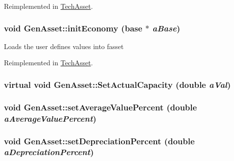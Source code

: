 Reimplemented in \hyperlink{class_tech_asset_ac7681ccf18e41a30b518f27cbde6a160}{TechAsset}.\hypertarget{class_gen_asset_a061638306e81bee77e8dfef34fe84a93}{
\subsubsection[{initEconomy}]{\setlength{\rightskip}{0pt plus 5cm}void GenAsset::initEconomy ({\bf base} $\ast$ {\em aBase})}}
\label{class_gen_asset_a061638306e81bee77e8dfef34fe84a93}
Loads the user defines values into fasset 

Reimplemented in \hyperlink{class_tech_asset_a405c511686ff6c8051ee748db53cd045}{TechAsset}.\hypertarget{class_gen_asset_a035e6cf6dbf11b247c330be31283bea8}{
\subsubsection[{SetActualCapacity}]{\setlength{\rightskip}{0pt plus 5cm}virtual void GenAsset::SetActualCapacity (double {\em aVal})}}
\label{class_gen_asset_a035e6cf6dbf11b247c330be31283bea8}
\hypertarget{class_gen_asset_a895d5e2aacd3c4c142b98a50596c31ce}{
\subsubsection[{setAverageValuePercent}]{\setlength{\rightskip}{0pt plus 5cm}void GenAsset::setAverageValuePercent (double {\em aAverageValuePercent})}}
\label{class_gen_asset_a895d5e2aacd3c4c142b98a50596c31ce}
\hypertarget{class_gen_asset_afa9db65e8103f3379d2d947573965e80}{
\subsubsection[{setDepreciationPercent}]{\setlength{\rightskip}{0pt plus 5cm}void GenAsset::setDepreciationPercent (double {\em aDepreciationPercent})}}
